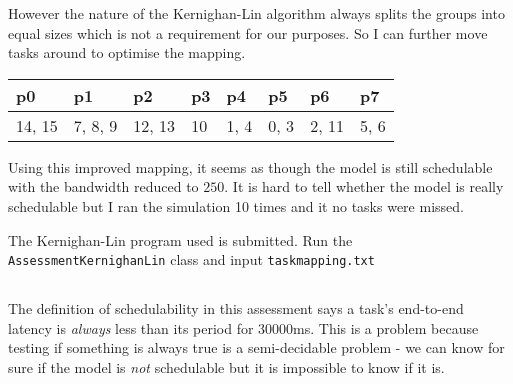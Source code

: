 \documentclass{article}
\newcommand{\code}[1]{\texttt{#1}}
\begin{document}
However the nature of the Kernighan-Lin algorithm always splits the groups into equal sizes which is not a requirement for our purposes. So I can further move tasks around to optimise the mapping.

\begin{table}[H]
  \centering \small
  \begin{tabular}{|l|l|l|l||l|l|l|l|}
    \hline
p0     & p1      & p2     & p3 & p4   & p5   & p6    & p7 \\ \hline
14, 15 & 7, 8, 9 & 12, 13 & 10 & 1, 4 & 0, 3 & 2, 11 & 5, 6 \\ \hline
\end{tabular}
\end{table}

Using this improved mapping, it seems as though the model is still schedulable with the bandwidth reduced to $250$. It is hard to tell whether the model is really schedulable but I ran the simulation 10 times and it no tasks were missed.

The Kernighan-Lin program used is submitted. Run the \code{AssessmentKernighanLin} class and input \code{taskmapping.txt}

\subsection{}

The definition of schedulability in this assessment says a task's end-to-end latency is \emph{always} less than its period for 30000ms. This is a problem because testing if something is always true is a semi-decidable problem - we can know for sure if the model is \emph{not} schedulable but it is impossible to know if it is.
\end{document}
